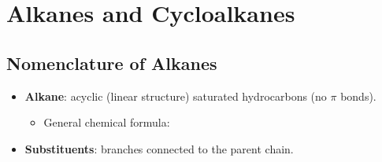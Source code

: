\documentclass[12pt,a4paper]{article}
\begin{document}

\clearpage
\section{Alkanes and Cycloalkanes}
\subsection{Nomenclature of Alkanes}
\begin{itemize}
    \item \textbf{Alkane}: acyclic (linear structure) saturated hydrocarbons (no $\pi$ bonds).
        \begin{itemize}
            \item General chemical formula: {\color{o-Sun}}
        \end{itemize}
    \item \textbf{Substituents}: branches connected to the parent chain.

\end{itemize}
\end{document}

